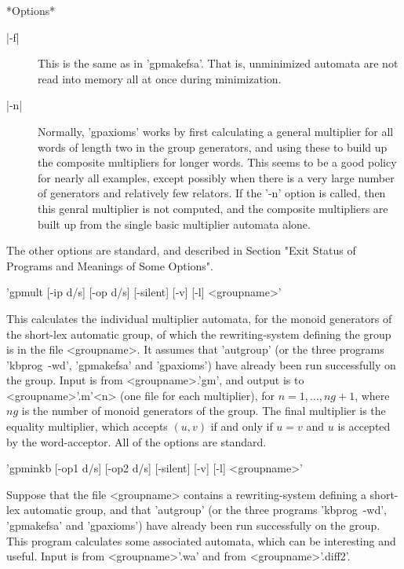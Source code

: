 *Options*
\begin{description}
\item[|-f|]
This is the same as in 'gpmakefsa'. That is, unminimized automata are not
read into memory all at once during minimization.
\item[|-n|]
Normally, 'gpaxioms' works by first calculating a general multiplier for
all words of length two in the group generators, and using these to
build up the composite multipliers for longer words. This seems to be
a good policy for nearly all examples, except possibly when there is
a very large number of generators and relatively few relators.
If the '-n' option is called, then this genral multiplier is not
computed, and the composite multipliers are built up from the
single basic multiplier automata alone.
\end{description}

The other options are standard, and described in Section 
"Exit Status of Programs and Meanings of Some Options".

'gpmult [-ip d/s] [-op d/s] [-silent] [-v] [-l] <groupname>'

This calculates the individual multiplier automata, for the monoid
generators of the short-lex automatic group, of which the rewriting-system
defining the group is in the file <groupname>.
It assumes that 'autgroup' (or the three programs 'kbprog\ -wd', 'gpmakefsa'
and 'gpaxioms') have already been run successfully on the group.
Input is from <groupname>.'gm', and output is to <groupname>'.m'<n>
(one file for each multiplier), for $n = 1, \ldots , ng+1$, where $ng$ is
the number of monoid generators of the group. The final multiplier is
the equality multiplier, which accepts $(u,v)$ if and only if $u = v$ and
$u$ is accepted by the word-acceptor.
All of the options are standard.

'gpminkb [-op1 d/s] [-op2 d/s] [-silent] [-v] [-l] <groupname>'

Suppose that the file <groupname> contains a rewriting-system
defining a short-lex automatic group,
and that 'autgroup' (or the three programs 'kbprog\ -wd', 'gpmakefsa'
and 'gpaxioms') have already been run successfully on the group.
This program calculates some associated automata, which can be
interesting and useful. Input is from <groupname>'.wa' and from
<groupname>'.diff2'.

